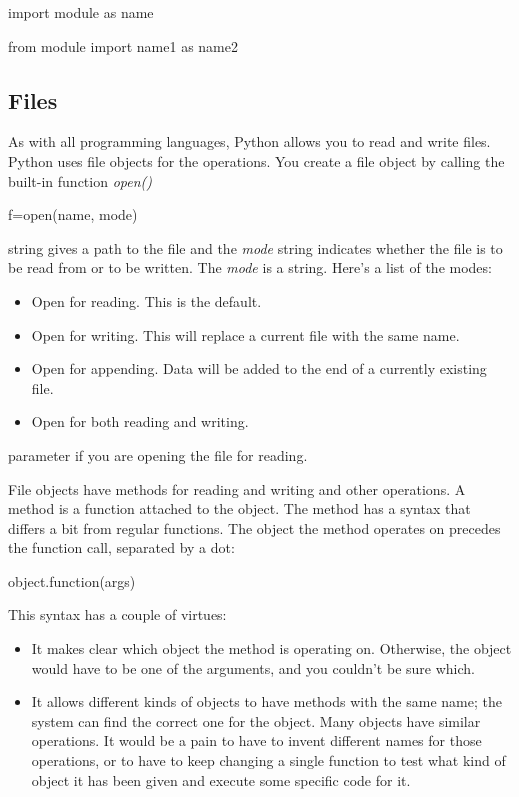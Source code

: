 import module as name

from module import name1 as name2

\subsection{Files}

As with all programming languages,
Python allows you to read and write files. Python uses file objects for
the operations. You create a file object by calling the built-in
function \emph{open()}

f=open(name, mode)

 string gives
a path to the file and the \emph{mode} string indicates whether the file
is to be read from or to be written. The \emph{mode} is a string. Here's
a list of the modes:

\begin{itemize}

\item
   Open for reading.
  This is the default.
\item
   Open for writing.
  This will replace a current file with the same name.
\item
   Open for appending.
  Data will be added to the end of a currently existing file.
\item
   Open for both
  reading and writing.
\end{itemize}


parameter if you are opening the file for reading.

File objects have methods for
reading and writing and other operations. A method is a function
attached to the object. The method has a syntax that differs a bit from
regular functions. The object the method operates on precedes the
function call, separated by a dot:

object.function(args)

This syntax has a couple of
virtues:

\begin{itemize}

\item
  It makes clear which object the
  method is operating on. Otherwise, the object would have to be one of
  the arguments, and you couldn't be sure which.
\item
  It allows different kinds of
  objects to have methods with the same name; the system can find the
  correct one for the object. Many objects have similar operations. It
  would be a pain to have to invent different names for those
  operations, or to have to keep changing a single function to test what
  kind of object it has been given and execute some specific code for
  it.
\end{itemize}

